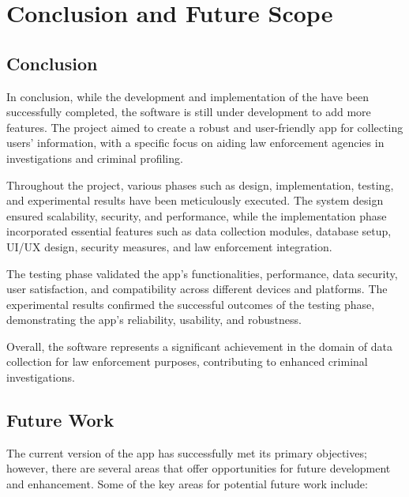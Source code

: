 \chapter{Conclusion and Future Scope}

\section*{Conclusion}

In conclusion, while the development and implementation of the {\myprojectname} have been successfully completed, the software is still under development to add more features. The project aimed to create a robust and user-friendly app for collecting users' information, with a specific focus on aiding law enforcement agencies in investigations and criminal profiling.

Throughout the project, various phases such as design, implementation, testing, and experimental results have been meticulously executed. The system design ensured scalability, security, and performance, while the implementation phase incorporated essential features such as data collection modules, database setup, UI/UX design, security measures, and law enforcement integration.

The testing phase validated the app's functionalities, performance, data security, user satisfaction, and compatibility across different devices and platforms. The experimental results confirmed the successful outcomes of the testing phase, demonstrating the app's reliability, usability, and robustness.

Overall, the {\myprojectname} software represents a significant achievement in the domain of data collection for law enforcement purposes, contributing to enhanced criminal investigations.

\section*{Future Work}

The current version of the \textbf{{{\myprojectname}}} app has successfully met its primary objectives; however, there are several areas that offer opportunities for future development and enhancement. Some of the key areas for potential future work include:

